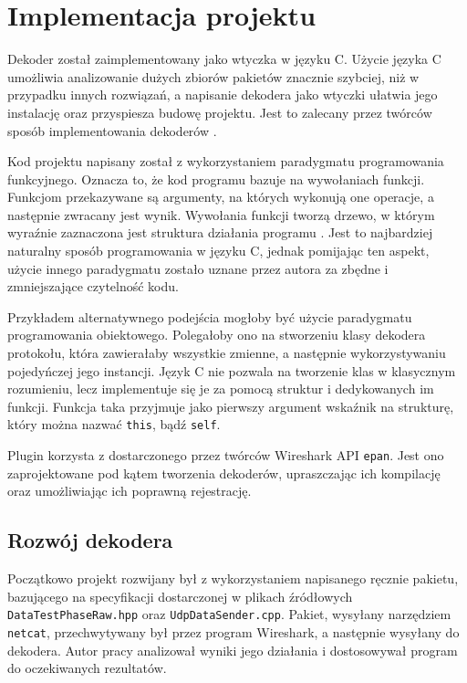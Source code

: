 \documentclass[a4paper, 11pt, twoside, openright]{article}
\begin{document}
	\indent\par


\cleardoublepage
\section{Implementacja projektu}

	\indent\par
	Dekoder został zaimplementowany jako wtyczka w języku C. Użycie języka C umożliwia analizowanie dużych zbiorów pakietów znacznie
	szybciej, niż w przypadku innych rozwiązań, a napisanie dekodera jako wtyczki ułatwia jego instalację oraz przyspiesza budowę projektu.
	Jest to zalecany przez twórców sposób implementowania dekoderów \cite{README.plugins}.

	Kod projektu napisany został z wykorzystaniem paradygmatu programowania funkcyjnego. Oznacza to, że kod programu bazuje na wywołaniach
	funkcji. Funkcjom przekazywane są argumenty, na których wykonują one operacje, a następnie zwracany jest wynik. Wywołania funkcji tworzą drzewo,
	w którym wyraźnie zaznaczona jest struktura działania programu \cite{C Podrecznik}. Jest to najbardziej naturalny sposób programowania w języku C,
	jednak pomijając ten aspekt, użycie innego paradygmatu zostało uznane przez autora za zbędne i zmniejszające czytelność kodu.

	Przykładem alternatywnego podejścia mogłoby być użycie paradygmatu programowania obiektowego. Polegałoby ono na stworzeniu
	klasy dekodera protokołu, która zawierałaby wszystkie zmienne, a następnie wykorzystywaniu pojedyńczej jego instancji. Język C
	nie pozwala na tworzenie klas w klasycznym rozumieniu, lecz implementuje się je za pomocą struktur i dedykowanych im funkcji.
	Funkcja taka przyjmuje jako pierwszy argument wskaźnik na strukturę, który można nazwać \texttt{this}, bądź \texttt{self}.

	Plugin korzysta z dostarczonego przez twórców Wireshark API \texttt{epan}. Jest ono zaprojektowane pod kątem tworzenia dekoderów,
	upraszczając ich kompilację oraz umożliwiając ich poprawną rejestrację.

	\subsection{Rozwój dekodera}

	\indent\par
	Początkowo projekt rozwijany był z wykorzystaniem napisanego ręcznie pakietu, bazującego na specyfikacji dostarczonej w plikach
	źródłowych \texttt{DataTestPhaseRaw.hpp} oraz \texttt{UdpDataSender.cpp}. Pakiet, wysyłany narzędziem \texttt{netcat},
	przechwytywany był przez program Wireshark, a następnie wysyłany do dekodera. Autor pracy analizował wyniki jego działania
	i dostosowywał program do oczekiwanych rezultatów.
\end{document}

